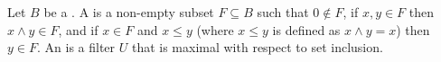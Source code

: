 \begin{definition} \label{definition:filter_and_ultrafilter_on_a_boolean_algebra}
Let $B$ be a .
A  is a non-empty subset $F \subseteq B$ such that $0 \notin F$, if $x, y \in F$ then $x \land y \in F$, and if $x \in F$ and $x \le y$ (where $x \le y$ is defined as $x \land y = x$) then $y \in F$. An  is a filter $U$ that is maximal with respect to set inclusion.
\end{definition}